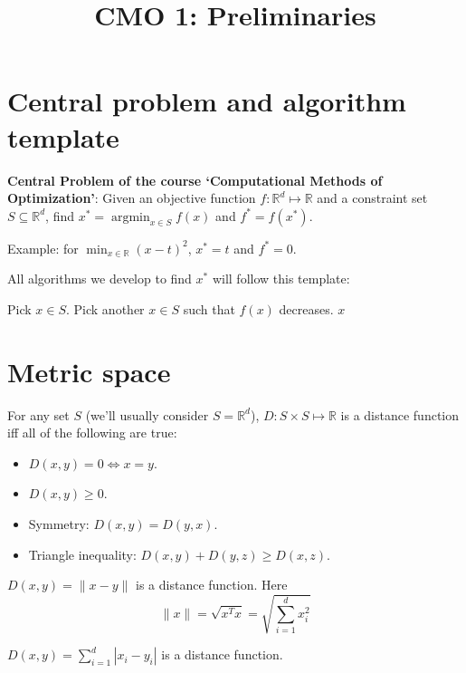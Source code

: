 


\usepackage{algorithm}
\usepackage{algpseudocode}

\title{CMO 1: Preliminaries}



\maketitle
\initMinimal{}

\tableofcontents

\section{Central problem and algorithm template}

\textbf{Central Problem of the course `Computational Methods of Optimization'}:
Given an objective function $f: \mathbb{R}^d \mapsto \mathbb{R}$
and a constraint set $S \subseteq \mathbb{R}^d$,
find $x^* = \operatorname{argmin}_{x \in S} f(x)$ and $f^* = f(x^*)$.

Example: for $\min_{x \in \mathbb{R}} (x-t)^2$, $x^* = t$ and $f^* = 0$.

All algorithms we develop to find $x^*$ will follow this template:
\begin{algorithm}[H]
\label{algo:template}
\begin{algorithmic}
\State Pick $x \in S$.
    \State Pick another $x \in S$ such that $f(x)$ decreases.
\EndWhile
\State \Return $x$
\end{algorithmic}
\end{algorithm}

\section{Metric space}

For any set $S$ (we'll usually consider $S = \mathbb{R}^d$),
$D: S \times S \mapsto \mathbb{R}$ is a distance function
iff all of the following are true:
\begin{itemize}
\item $D(x, y) = 0 \iff x = y$.
\item $D(x, y) \ge 0$.
\item Symmetry: $D(x, y) = D(y, x)$.
\item Triangle inequality: $D(x, y) + D(y, z) \ge D(x, z)$.
\end{itemize}

\begin{theorem}$D(x, y) = \|x - y\|$ is a distance function. Here
\[ \|x\| = \sqrt{x^Tx} = \sqrt{\sum_{i=1}^d x_i^2} \]
\end{theorem}
\begin{theorem}$D(x, y) = \sum_{i=1}^d |x_i - y_i|$ is a distance function.\end{theorem}


